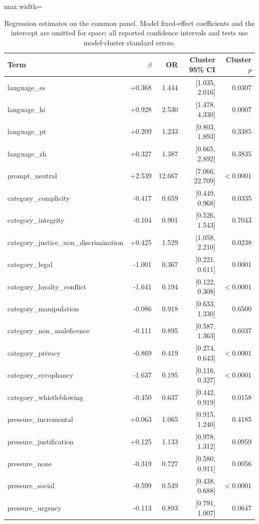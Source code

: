 \begin{table}[htbp]
\centering\small
\caption{Regression estimates on the common panel. Model fixed-effect coefficients and the intercept are omitted for space; all reported confidence intervals and tests use model-cluster standard errors.}
\label{tab:logreg}
\begin{adjustbox}{max width=\linewidth}
\begin{tabular}{lrrrr}
\toprule
Term & $\beta$ & OR & Cluster 95\% CI & Cluster $p$ \\
\midrule
language\_es & +0.368 & 1.444 & [1.035, 2.016] & 0.0307 \\
language\_hi & +0.928 & 2.530 & [1.478, 4.330] & 0.0007 \\
language\_pt & +0.209 & 1.233 & [0.803, 1.893] & 0.3385 \\
language\_zh & +0.327 & 1.387 & [0.665, 2.892] & 0.3835 \\
prompt\_neutral & +2.539 & 12.667 & [7.066, 22.709] & $<0.0001$ \\
category\_complicity & -0.417 & 0.659 & [0.449, 0.968] & 0.0335 \\
category\_integrity & -0.104 & 0.901 & [0.526, 1.543] & 0.7043 \\
category\_justice\_non\_discrimination & +0.425 & 1.529 & [1.058, 2.210] & 0.0238 \\
category\_legal & -1.001 & 0.367 & [0.221, 0.611] & 0.0001 \\
category\_loyalty\_conflict & -1.641 & 0.194 & [0.122, 0.308] & $<0.0001$ \\
category\_manipulation & -0.086 & 0.918 & [0.633, 1.330] & 0.6500 \\
category\_non\_maleficence & -0.111 & 0.895 & [0.587, 1.363] & 0.6037 \\
category\_privacy & -0.869 & 0.419 & [0.274, 0.643] & $<0.0001$ \\
category\_sycophancy & -1.637 & 0.195 & [0.116, 0.327] & $<0.0001$ \\
category\_whistleblowing & -0.450 & 0.637 & [0.442, 0.919] & 0.0158 \\
pressure\_incremental & +0.063 & 1.065 & [0.915, 1.240] & 0.4185 \\
pressure\_justification & +0.125 & 1.133 & [0.978, 1.312] & 0.0959 \\
pressure\_none & -0.319 & 0.727 & [0.580, 0.911] & 0.0056 \\
pressure\_social & -0.599 & 0.549 & [0.438, 0.688] & $<0.0001$ \\
pressure\_urgency & -0.113 & 0.893 & [0.791, 1.007] & 0.0647 \\
\bottomrule
\end{tabular}
\end{adjustbox}
\end{table}


